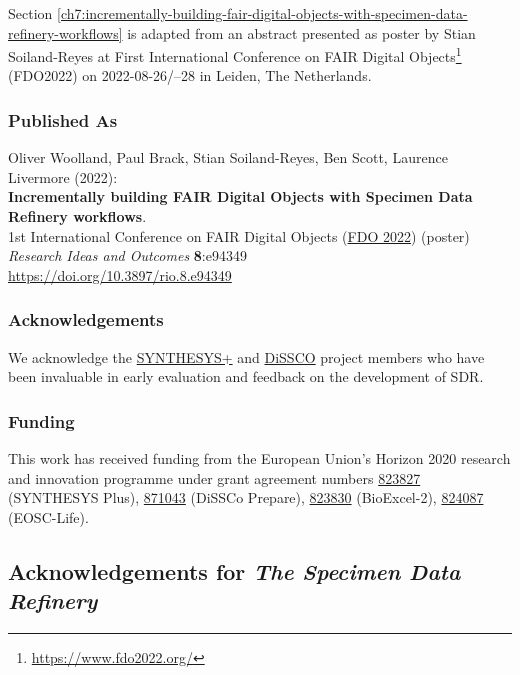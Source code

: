 Section \vref{ch7:incrementally-building-fair-digital-objects-with-specimen-data-refinery-workflows}  is adapted from an abstract
presented as poster by Stian Soiland-Reyes at 
First International Conference on FAIR Digital Objects\footnote{\url{https://www.fdo2022.org/}}
(FDO2022) on
2022-08-26/--28 in Leiden, The Netherlands. 

\subsubsection*{Published As}

Oliver Woolland, Paul Brack, Stian Soiland-Reyes, Ben Scott, Laurence
Livermore (2022):\\
\textbf{Incrementally building FAIR Digital Objects with Specimen Data
Refinery workflows}.\\
1st International Conference on FAIR Digital Objects
(\href{https://www.fdo2022.org/}{FDO 2022}) (poster)\\
\emph{Research Ideas and Outcomes} \textbf{8}:e94349\\
\url{https://doi.org/10.3897/rio.8.e94349}


\subsubsection*{Acknowledgements}

We acknowledge the \href{https://www.synthesys.info/}{SYNTHESYS+} and
\href{https://www.dissco.eu/}{DiSSCO} project members who have been
invaluable in early evaluation and feedback on the development of SDR.

\hypertarget{funding-2}{%
\subsubsection*{Funding}\label{funding-2}}

This work has received funding from the European Union's Horizon 2020
research and innovation programme under grant agreement numbers
\href{https://doi.org/10.3030/https://doi.org/10.3030/}{823827}
(SYNTHESYS Plus), \href{https://doi.org/10.3030/871043}{871043} (DiSSCo
Prepare), \href{https://doi.org/10.3030/823830}{823830} (BioExcel-2),
\href{https://doi.org/10.3030/824087}{824087} (EOSC-Life).




\subsection{Acknowledgements for \emph{The Specimen Data Refinery}}


